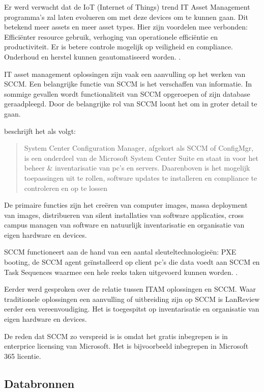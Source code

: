 Er werd verwacht dat de IoT (Internet of Things) trend IT Asset Management programma's zal laten evolueren om met deze devices om te kunnen gaan. Dit betekend meer assets en meer asset types. Hier zijn voordelen mee verbonden: Efficiënter resource gebruik, verhoging van operationele efficiëntie en productiviteit. Er is betere controle mogelijk op veiligheid en compliance. Onderhoud en herstel kunnen geautomatiseerd worden. \autocite{Badnakhe2020}.

IT asset management oplossingen zijn vaak een aanvulling op het werken van SCCM. Een belangrijke functie van SCCM is het verschaffen van informatie. In sommige gevallen wordt functionaliteit van SCCM opgeroepen of zijn database geraadpleegd. Door de belangrijke rol van SCCM loont het om in groter detail te gaan.

\textcite{Droogenbroot2016} beschrijft het als volgt:
\begin{quote}
    System Center Configuration Manager, afgekort als SCCM of ConfigMgr, is een onderdeel van de Microsoft System Center Suite en staat in voor het beheer \& inventarisatie van pc's en servers. Daarenboven is het mogelijk toepassingen uit te rollen, software updates te installeren en compliance te controleren en op te lossen
\end{quote}

De primaire functies zijn het creëren van computer images, massa deployment van images, distribueren van silent installaties van software applicaties, cross campus managen van software en natuurlijk inventarisatie en organisatie van eigen hardware en devices.

SCCM functioneert aan de hand van een aantal sleuteltechnologieën: PXE booting, de SCCM agent geïnstalleerd op client pc's die data voedt aan SCCM en Task Sequences waarmee een hele reeks taken uitgevoerd kunnen worden. \autocite{Spitze2019}.

Eerder werd gesproken over de relatie tussen ITAM oplossingen en SCCM. Waar traditionele oplossingen een aanvulling of uitbreiding zijn op SCCM is LanReview eerder een vereenvoudiging. Het is toegespitst op inventarisatie en organisatie van eigen hardware en devices.

De reden dat SCCM zo verspreid is is omdat het gratis inbegrepen is in enterprice licensing van Microsoft. Het is bijvoorbeeld inbegrepen in Microsoft 365 licentie. \autocite{MicrosoftDocs2020}

\subsection{Databronnen}

